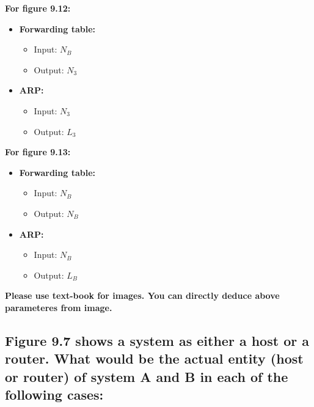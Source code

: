 \documentclass{article}
\begin{document}
\textbf{For figure 9.12:}
\begin{itemize}
	\item \textbf{ Forwarding table: }
	      \begin{itemize}
		      \item Input: \( N_B \)
		      \item Output: \( N_3 \)
	      \end{itemize}
	\item \textbf{ ARP: }
	      \begin{itemize}
		      \item Input: \(N_3\)
		      \item Output: \(L_3\)
	      \end{itemize}
\end{itemize}

\textbf{For figure 9.13:}
\begin{itemize}
	\item \textbf{ Forwarding table: }
	      \begin{itemize}
		      \item Input: \( N_B \)
		      \item Output: \( N_B \)
	      \end{itemize}
	\item \textbf{ ARP: }
	      \begin{itemize}
		      \item Input: \(N_B\)
		      \item Output: \(L_B\)
	      \end{itemize}
\end{itemize}

\textbf{Please use text-book for images. You can directly deduce above parameteres from image.}

\subsection{
	Figure 9.7 shows a system as either a host or a router. What would be the
	actual entity (host or router) of system A and B in each of the following cases:
}
\end{document}
